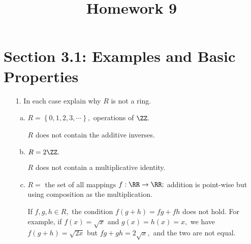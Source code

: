 \documentclass{article}
\begin{document}
\title{Homework 9}
\maketitle
\thispagestyle{fancy}

\section*{Section 3.1: Examples and Basic Properties}

\begin{itemize}
	\item[1.] In each case explain why $R$ is not a ring.
		\begin{enumerate}[(a)]
			\item $R=\left\{ 0, 1, 2, 3, \cdots \right\},$ operations of $\ZZ.$
				\begin{answer*}
					$R$ does not contain the additive inverses.
				\end{answer*}

			\item $R=2\ZZ.$
				\begin{answer*}
					$R$ does not contain a multiplicative identity.
				\end{answer*}

			\item $R=$ the set of all mappings $f:\RR\to\RR;$ addition is point-wise but using composition as the multiplication.
				\begin{answer*}
					If $f, g, h\in R,$ the condition $f(g+h)=fg+fh$ does not hold. For example, if $f(x)=\sqrt{x}$ and $g(x)=h(x)=x,$ we have $f(g+h)=\sqrt{2x}$ but $fg+gh=2\sqrt{x},$ and the two are not equal.
				\end{answer*}
				
		\end{enumerate}


\end{itemize}
\end{document}
